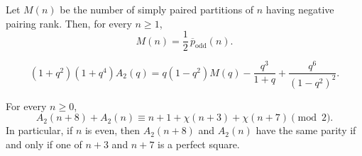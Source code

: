 \documentclass[10pt,a4paper]{amsart}
\begin{document}
\begin{theorem}\label{thm:odd-overpartition}
Let $M(n)$ be the number of simply paired partitions of $n$ having negative pairing rank.  Then, for every $n\geq1$,
\[
 M(n)=\frac12\,\overline p_{\mathrm{odd}}(n).
\]
\end{theorem}

\begin{equation}\label{eq:A2-M}
 (1+q^2)(1+q^4)A_2(q)
 =q(1-q^2)M(q)-\frac{q^3}{1+q}
 +\frac{q^6}{(1-q^2)^2}.
\end{equation}

\begin{theorem}\label{thm:square-switch}
For every $n\geq0$,
\begin{equation}\label{eq:square-switch}
 A_2(n+8)+A_2(n)
 \equiv n+1+\chi(n+3)+\chi(n+7)\pmod2.
\end{equation}
In particular, if $n$ is even, then $A_2(n+8)$ and $A_2(n)$ have the same parity if and only if one of $n+3$ and $n+7$ is a perfect square.
\end{theorem}
\end{document}
